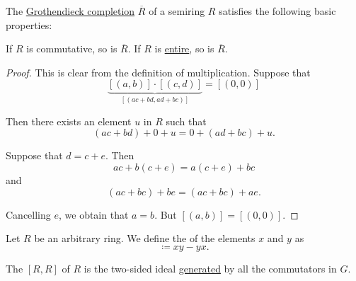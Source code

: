 \begin{proposition}\label{thm:def:grothendieck_semiring_completion}
  The \hyperref[thm:grothendieck_semiring_completion]{Grothendieck completion} \( \overline{R} \) of a semiring \( R \) satisfies the following basic properties:
  \begin{thmenum}
     If \( R \) is commutative, so is \( \overline{R} \).
     If \( R \) is \hyperref[def:entire_semiring]{entire}, so is \( \overline{R} \).
  \end{thmenum}
\end{proposition}
\begin{proof}
   This is clear from the definition of multiplication.
   Suppose that
  \begin{equation*}
    \underbrace{[(a, b)] \cdot [(c, d)]}_{[(ac + bd, ad + bc)]} = [(0, 0)]
  \end{equation*}

  Then there exists an element \( u \) in \( R \) such that
  \begin{equation*}
    (ac + bd) + 0 + u = 0 + (ad + bc) + u.
  \end{equation*}

  Suppose that \( d = c + e \). Then
  \begin{equation*}
    ac + b(c + e) = a(c + e) + bc
  \end{equation*}
  and
  \begin{equation*}
    (ac + bc) + be = (ac + bc) + ae.
  \end{equation*}

  Cancelling \( e \), we obtain that \( a = b \). But \( [(a, b)] = [(0, 0)] \).
\end{proof}

\begin{definition}\label{def:ring_commutator}
  Let \( R \) be an arbitrary ring. We define the  of the elements \( x \) and \( y \) as
  \begin{equation*}
    [x, y] \coloneqq xy - yx.
  \end{equation*}

  The  \( [R, R] \) of \( R \) is the two-sided ideal \hyperref[def:semiring_ideal/generated]{generated} by all the commutators in \( G \).
\end{definition}

